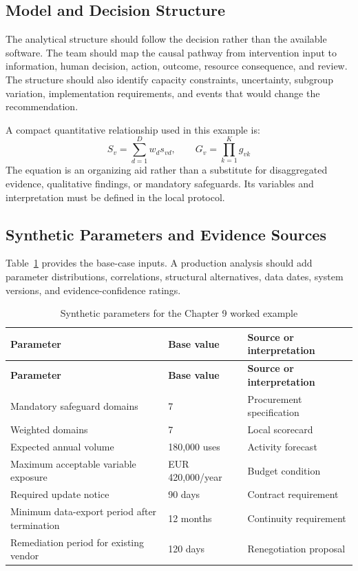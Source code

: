\subsection{Model and Decision Structure}
The analytical structure should follow the decision rather than the available
software. The team should map the causal pathway from intervention input to
information, human decision, action, outcome, resource consequence, and review.
The structure should also identify capacity constraints, uncertainty, subgroup
variation, implementation requirements, and events that would change the
recommendation.

A compact quantitative relationship used in this example is:
\begin{equation}
S_v=\sum_{d=1}^{D}w_ds_{vd},\qquad G_v=\prod_{k=1}^{K}g_{vk}
\label{eq:comp-ch09-key-relationship}
\end{equation}
The equation is an organizing aid rather than a substitute for disaggregated evidence,
qualitative findings, or mandatory safeguards. Its variables and interpretation must
be defined in the local protocol.

\subsection{Synthetic Parameters and Evidence Sources}
Table~\ref{tab:comp-ch09-parameters} provides the base-case inputs. A
production analysis should add parameter distributions, correlations, structural
alternatives, data dates, system versions, and evidence-confidence ratings.

\begin{longtable}{@{}p{}p{}p{}@{}}
\caption{Synthetic parameters for the Chapter 9 worked example}
\label{tab:comp-ch09-parameters}\\
\toprule
\textbf{Parameter} & \textbf{Base value} & \textbf{Source or interpretation} \\
\midrule
\endfirsthead
\toprule
\textbf{Parameter} & \textbf{Base value} & \textbf{Source or interpretation} \\
\midrule
\endhead
\bottomrule
\endlastfoot
Mandatory safeguard domains & 7 & Procurement specification \\
Weighted domains & 7 & Local scorecard \\
Expected annual volume & 180,000 uses & Activity forecast \\
Maximum acceptable variable exposure & EUR 420,000/year & Budget condition \\
Required update notice & 90 days & Contract requirement \\
Minimum data-export period after termination & 12 months & Continuity requirement \\
Remediation period for existing vendor & 120 days & Renegotiation proposal \\
\end{longtable}

